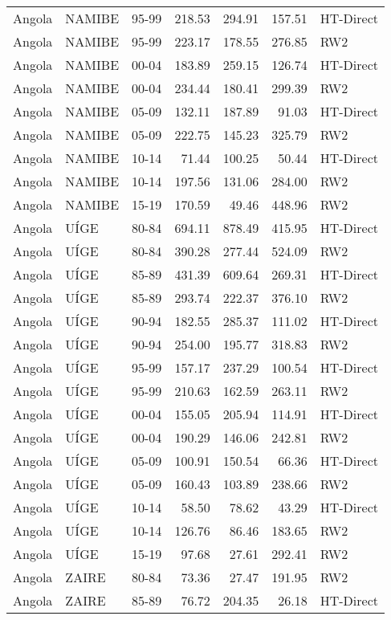 \begin{longtable}{lllrrrl}
  Angola & NAMIBE & 95-99 & 218.53 & 294.91 & 157.51 & HT-Direct \\ 
  Angola & NAMIBE & 95-99 & 223.17 & 178.55 & 276.85 & RW2 \\ 
  Angola & NAMIBE & 00-04 & 183.89 & 259.15 & 126.74 & HT-Direct \\ 
  Angola & NAMIBE & 00-04 & 234.44 & 180.41 & 299.39 & RW2 \\ 
  Angola & NAMIBE & 05-09 & 132.11 & 187.89 & 91.03 & HT-Direct \\ 
  Angola & NAMIBE & 05-09 & 222.75 & 145.23 & 325.79 & RW2 \\ 
  Angola & NAMIBE & 10-14 & 71.44 & 100.25 & 50.44 & HT-Direct \\ 
  Angola & NAMIBE & 10-14 & 197.56 & 131.06 & 284.00 & RW2 \\ 
  Angola & NAMIBE & 15-19 & 170.59 & 49.46 & 448.96 & RW2 \\ 
  Angola & UÍGE & 80-84 & 694.11 & 878.49 & 415.95 & HT-Direct \\ 
  Angola & UÍGE & 80-84 & 390.28 & 277.44 & 524.09 & RW2 \\ 
  Angola & UÍGE & 85-89 & 431.39 & 609.64 & 269.31 & HT-Direct \\ 
  Angola & UÍGE & 85-89 & 293.74 & 222.37 & 376.10 & RW2 \\ 
  Angola & UÍGE & 90-94 & 182.55 & 285.37 & 111.02 & HT-Direct \\ 
  Angola & UÍGE & 90-94 & 254.00 & 195.77 & 318.83 & RW2 \\ 
  Angola & UÍGE & 95-99 & 157.17 & 237.29 & 100.54 & HT-Direct \\ 
  Angola & UÍGE & 95-99 & 210.63 & 162.59 & 263.11 & RW2 \\ 
  Angola & UÍGE & 00-04 & 155.05 & 205.94 & 114.91 & HT-Direct \\ 
  Angola & UÍGE & 00-04 & 190.29 & 146.06 & 242.81 & RW2 \\ 
  Angola & UÍGE & 05-09 & 100.91 & 150.54 & 66.36 & HT-Direct \\ 
  Angola & UÍGE & 05-09 & 160.43 & 103.89 & 238.66 & RW2 \\ 
  Angola & UÍGE & 10-14 & 58.50 & 78.62 & 43.29 & HT-Direct \\ 
  Angola & UÍGE & 10-14 & 126.76 & 86.46 & 183.65 & RW2 \\ 
  Angola & UÍGE & 15-19 & 97.68 & 27.61 & 292.41 & RW2 \\ 
  Angola & ZAIRE & 80-84 & 73.36 & 27.47 & 191.95 & RW2 \\ 
  Angola & ZAIRE & 85-89 & 76.72 & 204.35 & 26.18 & HT-Direct \\ 

\end{longtable}
